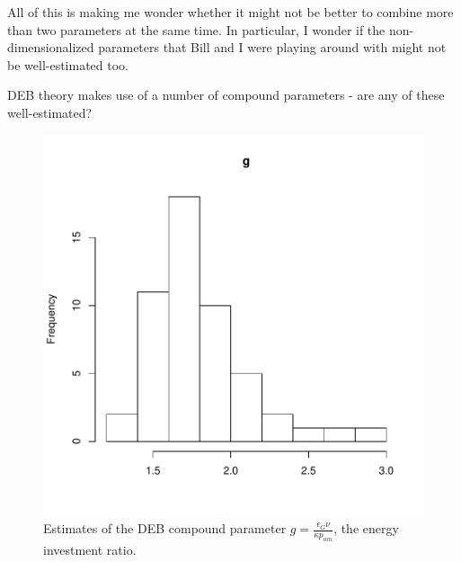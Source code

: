 \documentclass[12pt,reqno,final]{amsart}
\theoremstyle{plain}
\numberwithin{equation}{part}
\begin{document}
All of this is making me wonder whether it might not be better to
combine more than two parameters at the same time. In particular, I
wonder if the non-dimensionalized parameters that Bill and I were
playing around with might not be well-estimated too.

DEB theory makes use of a number of compound parameters - are any of
these well-estimated?

\begin{figure}
\includegraphics{Solving_the_problem_of_parameter_covariation_4-008}
\caption{Estimates of the DEB compound parameter $g =
  \frac{\epsilon_G \nu}{\kappa p_{am}}$, the energy investment
  ratio.}
\end{figure}
\end{document}
